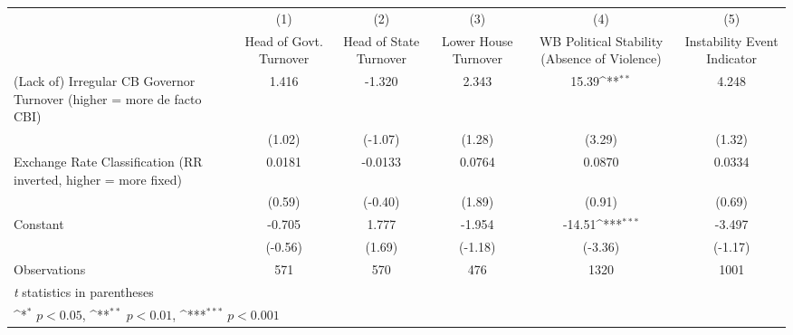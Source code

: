 {
\def\sym#1{\ifmmode^{#1}\else\(^{#1}\)\fi}
\begin{tabular*}{\linewidth}{@{\hskip\tabcolsep\extracolsep\fill}l*{5}{c}}
\hline\hline
                &\multicolumn{1}{c}{(1)}&\multicolumn{1}{c}{(2)}&\multicolumn{1}{c}{(3)}&\multicolumn{1}{c}{(4)}&\multicolumn{1}{c}{(5)}\\
                &\multicolumn{1}{c}{Head of Govt. Turnover}&\multicolumn{1}{c}{Head of State Turnover}&\multicolumn{1}{c}{Lower House Turnover}&\multicolumn{1}{c}{WB Political Stability (Absence of Violence)}&\multicolumn{1}{c}{Instability Event Indicator}\\
\hline
(Lack of) Irregular CB Governor Turnover (higher = more de facto CBI)&    1.416         &   -1.320         &    2.343         &    15.39\sym{**} &    4.248         \\
                &   (1.02)         &  (-1.07)         &   (1.28)         &   (3.29)         &   (1.32)         \\
[1em]
Exchange Rate Classification (RR inverted, higher = more fixed)&   0.0181         &  -0.0133         &   0.0764         &   0.0870         &   0.0334         \\
                &   (0.59)         &  (-0.40)         &   (1.89)         &   (0.91)         &   (0.69)         \\
[1em]
Constant        &   -0.705         &    1.777         &   -1.954         &   -14.51\sym{***}&   -3.497         \\
                &  (-0.56)         &   (1.69)         &  (-1.18)         &  (-3.36)         &  (-1.17)         \\
\hline
Observations    &      571         &      570         &      476         &     1320         &     1001         \\
\hline\hline
\multicolumn{6}{l}{\footnotesize \textit{t} statistics in parentheses}\\
\multicolumn{6}{l}{\footnotesize \sym{*} \(p<0.05\), \sym{**} \(p<0.01\), \sym{***} \(p<0.001\)}\\
\end{tabular*}
}
